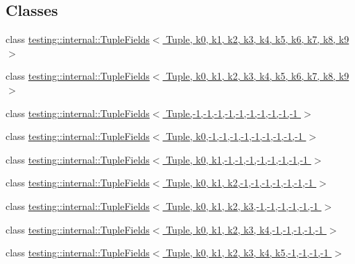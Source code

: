 \subsection*{Classes}
\begin{DoxyCompactItemize}
\item 
class \hyperlink{classtesting_1_1internal_1_1_tuple_fields}{testing\+::internal\+::\+Tuple\+Fields$<$ Tuple, k0, k1, k2, k3, k4, k5, k6, k7, k8, k9 $>$}
\item 
class \hyperlink{classtesting_1_1internal_1_1_tuple_fields}{testing\+::internal\+::\+Tuple\+Fields$<$ Tuple, k0, k1, k2, k3, k4, k5, k6, k7, k8, k9 $>$}
\item 
class \hyperlink{classtesting_1_1internal_1_1_tuple_fields_3_01_tuple_00-1_00-1_00-1_00-1_00-1_00-1_00-1_00-1_00-1_00-1_01_4}{testing\+::internal\+::\+Tuple\+Fields$<$ Tuple,-\/1,-\/1,-\/1,-\/1,-\/1,-\/1,-\/1,-\/1,-\/1,-\/1 $>$}
\item 
class \hyperlink{classtesting_1_1internal_1_1_tuple_fields_3_01_tuple_00_01k0_00-1_00-1_00-1_00-1_00-1_00-1_00-1_00-1_00-1_01_4}{testing\+::internal\+::\+Tuple\+Fields$<$ Tuple, k0,-\/1,-\/1,-\/1,-\/1,-\/1,-\/1,-\/1,-\/1,-\/1 $>$}
\item 
class \hyperlink{classtesting_1_1internal_1_1_tuple_fields_3_01_tuple_00_01k0_00_01k1_00-1_00-1_00-1_00-1_00-1_00-1_00-1_00-1_01_4}{testing\+::internal\+::\+Tuple\+Fields$<$ Tuple, k0, k1,-\/1,-\/1,-\/1,-\/1,-\/1,-\/1,-\/1,-\/1 $>$}
\item 
class \hyperlink{classtesting_1_1internal_1_1_tuple_fields_3_01_tuple_00_01k0_00_01k1_00_01k2_00-1_00-1_00-1_00-1_00-1_00-1_00-1_01_4}{testing\+::internal\+::\+Tuple\+Fields$<$ Tuple, k0, k1, k2,-\/1,-\/1,-\/1,-\/1,-\/1,-\/1,-\/1 $>$}
\item 
class \hyperlink{classtesting_1_1internal_1_1_tuple_fields_3_01_tuple_00_01k0_00_01k1_00_01k2_00_01k3_00-1_00-1_00-1_00-1_00-1_00-1_01_4}{testing\+::internal\+::\+Tuple\+Fields$<$ Tuple, k0, k1, k2, k3,-\/1,-\/1,-\/1,-\/1,-\/1,-\/1 $>$}
\item 
class \hyperlink{classtesting_1_1internal_1_1_tuple_fields_3_01_tuple_00_01k0_00_01k1_00_01k2_00_01k3_00_01k4_00-1_00-1_00-1_00-1_00-1_01_4}{testing\+::internal\+::\+Tuple\+Fields$<$ Tuple, k0, k1, k2, k3, k4,-\/1,-\/1,-\/1,-\/1,-\/1 $>$}
\item 
class \hyperlink{classtesting_1_1internal_1_1_tuple_fields_3_01_tuple_00_01k0_00_01k1_00_01k2_00_01k3_00_01k4_00_01k5_00-1_00-1_00-1_00-1_01_4}{testing\+::internal\+::\+Tuple\+Fields$<$ Tuple, k0, k1, k2, k3, k4, k5,-\/1,-\/1,-\/1,-\/1 $>$}

\end{DoxyCompactItemize}
